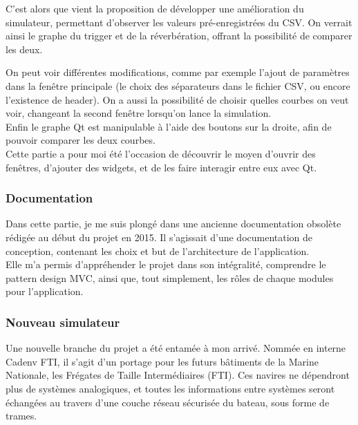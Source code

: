 \documentclass{rapport}
\begin{document}

C'est alors que vient la proposition de développer une amélioration du simulateur, permettant d'observer les valeurs pré-enregistrées du CSV. On verrait ainsi le graphe du trigger et de la réverbération, offrant la possibilité de comparer les deux.



On peut voir différentes modifications, comme par exemple l'ajout de paramètres dans la fenêtre principale (le choix des séparateurs dans le fichier CSV, ou encore l'existence de header). On a aussi la possibilité de choisir quelles courbes on veut voir, changeant la second fenêtre lorsqu'on lance la simulation.\\
Enfin le graphe Qt est manipulable à l'aide des boutons sur la droite, afin de pouvoir comparer les deux courbes.\\

Cette partie a pour moi été l'occasion de découvrir le moyen d'ouvrir des fenêtres, d'ajouter des widgets, et de les faire interagir entre eux avec Qt.

\subsubsection{Documentation}

Dans cette partie, je me suis plongé dans une ancienne documentation obsolète rédigée au début du projet en 2015. Il s'agissait d'une documentation de conception, contenant les choix et but de l'architecture de l'application. \\

Elle m'a permis d'appréhender le projet dans son intégralité, comprendre le pattern design MVC, ainsi que, tout simplement, les rôles de chaque modules pour l'application.

\subsubsection{Nouveau simulateur}

Une nouvelle branche du projet a été entamée à mon arrivé. Nommée en interne Cadenv FTI, il s'agit d'un portage pour les futurs bâtiments de la Marine Nationale, les Frégates de Taille Intermédiaires (FTI). Ces navires ne dépendront plus de systèmes analogiques, et toutes les informations entre systèmes seront échangées au travers d'une couche réseau sécurisée du bateau, sous forme de trames.\\
\end{document}

